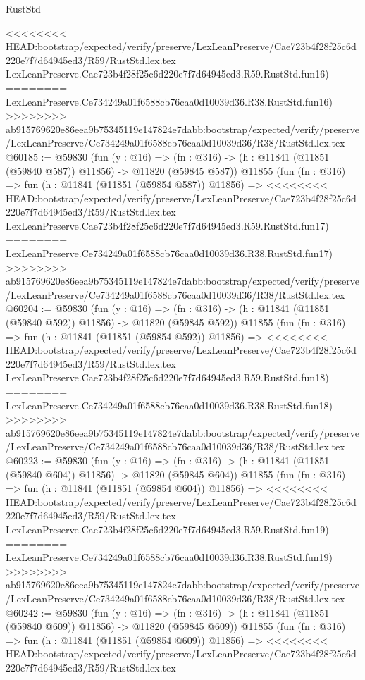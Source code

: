 \begin{lexlean}{RustStd}
\begin{coremodule}
{\begin{coremodule}
{{{{{{{{{{{{{{{{{{{{{{{{{{{{{{{{{{{{{{{{{{{{{{{{{{<<<<<<<< HEAD:bootstrap/expected/verify/preserve/LexLeanPreserve/Cae723b4f28f25c6d220e7f7d64945ed3/R59/RustStd.lex.tex
    LexLeanPreserve.Cae723b4f28f25c6d220e7f7d64945ed3.R59.RustStd.fun16)
========
    LexLeanPreserve.Ce734249a01f6588cb76caa0d10039d36.R38.RustStd.fun16)
>>>>>>>> ab915769620e86eea9b75345119e147824e7dabb:bootstrap/expected/verify/preserve/LexLeanPreserve/Ce734249a01f6588cb76caa0d10039d36/R38/RustStd.lex.tex
@60185 := @59830
    (fun (y : @16) =>
    (fn : @316) -> (h : @11841 (@11851 (@59840 @587)) @11856) -> @11820 (@59845 @587))
    @11855
    (fun (fn : @316) =>
    fun (h : @11841 (@11851 (@59854 @587)) @11856) =>
<<<<<<<< HEAD:bootstrap/expected/verify/preserve/LexLeanPreserve/Cae723b4f28f25c6d220e7f7d64945ed3/R59/RustStd.lex.tex
    LexLeanPreserve.Cae723b4f28f25c6d220e7f7d64945ed3.R59.RustStd.fun17)
========
    LexLeanPreserve.Ce734249a01f6588cb76caa0d10039d36.R38.RustStd.fun17)
>>>>>>>> ab915769620e86eea9b75345119e147824e7dabb:bootstrap/expected/verify/preserve/LexLeanPreserve/Ce734249a01f6588cb76caa0d10039d36/R38/RustStd.lex.tex
@60204 := @59830
    (fun (y : @16) =>
    (fn : @316) -> (h : @11841 (@11851 (@59840 @592)) @11856) -> @11820 (@59845 @592))
    @11855
    (fun (fn : @316) =>
    fun (h : @11841 (@11851 (@59854 @592)) @11856) =>
<<<<<<<< HEAD:bootstrap/expected/verify/preserve/LexLeanPreserve/Cae723b4f28f25c6d220e7f7d64945ed3/R59/RustStd.lex.tex
    LexLeanPreserve.Cae723b4f28f25c6d220e7f7d64945ed3.R59.RustStd.fun18)
========
    LexLeanPreserve.Ce734249a01f6588cb76caa0d10039d36.R38.RustStd.fun18)
>>>>>>>> ab915769620e86eea9b75345119e147824e7dabb:bootstrap/expected/verify/preserve/LexLeanPreserve/Ce734249a01f6588cb76caa0d10039d36/R38/RustStd.lex.tex
@60223 := @59830
    (fun (y : @16) =>
    (fn : @316) -> (h : @11841 (@11851 (@59840 @604)) @11856) -> @11820 (@59845 @604))
    @11855
    (fun (fn : @316) =>
    fun (h : @11841 (@11851 (@59854 @604)) @11856) =>
<<<<<<<< HEAD:bootstrap/expected/verify/preserve/LexLeanPreserve/Cae723b4f28f25c6d220e7f7d64945ed3/R59/RustStd.lex.tex
    LexLeanPreserve.Cae723b4f28f25c6d220e7f7d64945ed3.R59.RustStd.fun19)
========
    LexLeanPreserve.Ce734249a01f6588cb76caa0d10039d36.R38.RustStd.fun19)
>>>>>>>> ab915769620e86eea9b75345119e147824e7dabb:bootstrap/expected/verify/preserve/LexLeanPreserve/Ce734249a01f6588cb76caa0d10039d36/R38/RustStd.lex.tex
@60242 := @59830
    (fun (y : @16) =>
    (fn : @316) -> (h : @11841 (@11851 (@59840 @609)) @11856) -> @11820 (@59845 @609))
    @11855
    (fun (fn : @316) =>
    fun (h : @11841 (@11851 (@59854 @609)) @11856) =>
<<<<<<<< HEAD:bootstrap/expected/verify/preserve/LexLeanPreserve/Cae723b4f28f25c6d220e7f7d64945ed3/R59/RustStd.lex.tex
}}}}}}}}}}}}}}}}}}}}}}}}}}}}}}}}}}}}}}}}}}}}}}}}}}
\end{coremodule}}
\end{coremodule}
\end{lexlean}
